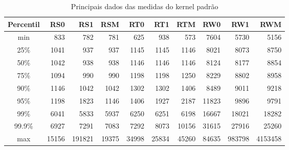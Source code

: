 \begin{table}[h!]
\centering
\begin{center}
\begin{tabular}{|c||r|r|r|r|r|r|r|r|r|}
\toprule
Percentil &    RS0 &     RS1 &    RSM &    RT0 &    RT1 &    RTM &    RW0 &     RW1 &      RWM \\
\midrule
    min &    833 &     782 &    781 &    625 &    938 &    573 &   7604 &    5730 &     5156 \\
    25\% &   1041 &     937 &    937 &   1145 &   1145 &   1146 &   8021 &    8073 &     8750 \\
    50\% &   1042 &     938 &    938 &   1146 &   1146 &   1146 &   8124 &    8177 &     8854 \\
    75\% &   1094 &     990 &    990 &   1198 &   1198 &   1250 &   8229 &    8802 &     8958 \\
    90\% &   1146 &    1042 &   1042 &   1302 &   1302 &   1406 &   8489 &    9011 &     9218 \\
    95\% &   1198 &    1823 &   1146 &   1406 &   1927 &   2187 &  11823 &    9896 &     9791 \\
    99\% &   6041 &    5833 &   5937 &   6250 &   6251 &   6198 &  16667 &   18021 &    18282 \\
    99.9\% &   6927 &    7291 &   7083 &   7292 &   8073 &  10156 &  31615 &   27916 &    25260 \\
    max &  15156 &  191821 &  19375 &  34998 &  25834 &  45260 &  84635 &  983798 &  4153458 \\
\bottomrule
\end{tabular}
\end{center}
\caption{Principais dados das medidas do kernel padrão}
\label{table:rpi}
\end{table}

